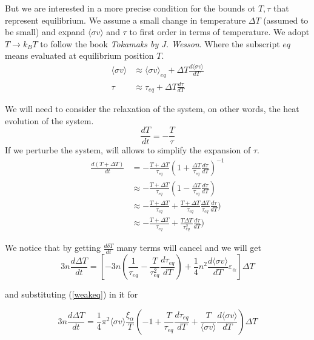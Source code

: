 \documentclass[smallextended]{svjour3}
\begin{document}
But we are interested in a more precise condition for the bounds ot $T, \tau$ that represent equilibrium. We assume a small change in temperature $\Delta T$ (assumed to be small) and expand $\langle \sigma v \rangle$ and $\tau$ to first order in terms of temperature. We adopt $T \to k_BT$ to follow the book \textit{Tokamaks by J. Wesson}.
Where the subscript $eq$ means evaluated at equilibrium position $T$.
\begin{align}
    \langle \sigma v \rangle &\approx \langle \sigma v \rangle_{eq} + \Delta T\frac{d\langle \sigma v \rangle}{dT} \\
    \tau &\approx \tau_{eq} + \Delta T\frac{d\tau}{dT}
\end{align}

We will need to consider the relaxation of the system, on other words, the heat evolution of the system.
\begin{equation}
    \frac{dT}{dt} = - \frac{T}{\tau}
\end{equation}
If we perturbe the system, will allows to simplify the expansion of $\tau$.
\begin{align}
    \frac{d(T+\Delta T)}{dt} &= - \frac{T+\Delta T} {\tau_{eq} } \left({1 + \frac{\Delta T}{\tau_{eq} }\frac{d\tau}{dT}} \right)^{-1} \\
    &\approx - \frac{T+\Delta T} {\tau_{eq} } \left(1 - \frac{\Delta T}{\tau_{eq}}\frac{d\tau}{dT}\right) \\
    &\approx - \frac{T+\Delta T} {\tau_{eq} } + \frac{T+\Delta T} {\tau_{eq} }\frac{\Delta T}{\tau_{eq}}\frac{d\tau}{dT})\\
    &\approx - \frac{T+\Delta T} {\tau_{eq} } + \frac{T\Delta T} {\tau_{eq}^2 }\frac{d\tau}{dT})
\end{align}

We notice that by getting $\frac{d\delta T}{dt}$ many terms will cancel and we will get
\begin{equation}
    3n \frac{d \Delta T}{d t} =
\left[-3n \left( \frac{1}{\tau_{eq}} - \frac{T}{\tau_{eq}^2} \frac{d \tau_{eq}}{d T} \right)
+ \frac{1}{4} n^2 \frac{d \langle \sigma v \rangle}{d T} \varepsilon_{\alpha} 
\right] \Delta T
\end{equation}

and substituting (\ref{weakeq}) in it for 

\begin{equation}
    3n \frac{d\Delta T}{dt} = \frac{1}{4} \pi^2 \langle \sigma v \rangle \frac{\xi_{\alpha}}{T} 
\left( -1 + \frac{T}{\tau_{eq}} \frac{d\tau_{eq}}{dT} + \frac{T}{\langle \sigma v \rangle} \frac{d\langle \sigma v \rangle}{dT} \right) \Delta T
\label{ETvariation}
\end{equation}
\end{document}
